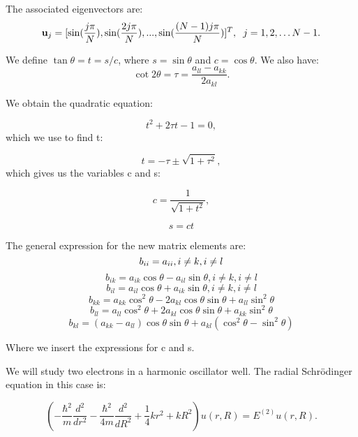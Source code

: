 \documentclass[norsk,a4paper,12pt]{article}
\begin{document}
The associated eigenvectors are:
\[
\mathbf{u}_j = [ \sin(\frac{j\pi}{N}), \sin(\frac{2j\pi}{N}), ..., \sin(\frac{(N-1)j\pi}{N}) ]^T, \hspace{0.2cm} j=1,2,\dots N-1.
\]

We define $\tan\theta = t= s/c$, where $s=\sin\theta$ and $c=\cos\theta$. We also have:
\begin{equation*}\cot 2\theta=\tau = \frac{a_{ll}-a_{kk}}{2a_{kl}}.
\end{equation*}

We obtain the quadratic equation:

\begin{equation*}
t^2+2\tau t-1= 0,
\end{equation*}
 which we use to find t:
 
\begin{equation*}
  t = -\tau \pm \sqrt{1+\tau^2},
\end{equation*}
which gives us the variables c and s:

\begin{equation*}
   c = \frac{1}{\sqrt{1+t^2}},
   \label{eq:c} 
\end{equation*}

\begin{equation*}
  s=ct
   \label{eq:s} 
\end{equation*}

The general expression for the new matrix elements are:
$$
b_{ii}=a_{ii}, i\neq k, i\neq l \\
$$
$$
b_{ik}=a_{ik}\cos \theta - a_{il}\sin \theta, i\neq k, i\neq l
$$
$$
b_{il}=a_{il}\cos\theta+a_{ik}\sin\theta, i\neq k, i\neq l
$$
$$
b_{kk}=a_{kk} \cos^2\theta - 2a_{kl}\cos\theta \sin\theta + a_{ll}\sin^2\theta
$$
$$
b_{ll}=a_{ll}\cos^2\theta+2a_{kl}\cos\theta \sin\theta + a_{kk}\sin^2\theta
$$
\begin{equation}
b_{kl} = (a_{kk}-a_{ll})\cos\theta\sin\theta+a_{kl}(\cos^2\theta-\sin^2\theta)
 \label{eq:Jacob}
 \end{equation}

Where we insert the expressions for c and s.

We will study two electrons in a harmonic oscillator well. The radial Schrödinger equation in this case is:

\begin{equation*}
\left(  -\frac{\hbar^2}{m} \frac{d^2}{dr^2} -\frac{\hbar^2}{4 m} \frac{d^2}{dR^2}+ \frac{1}{4} k r^2+  kR^2\right)u(r,R)  = E^{(2)} u(r,R).
\end{equation*}
\end{document}
